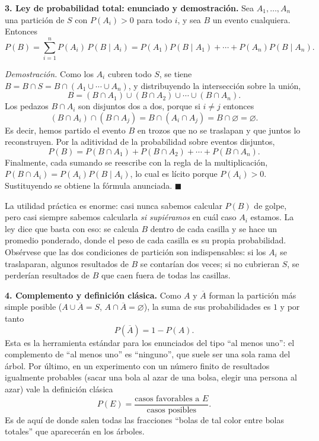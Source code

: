 \documentclass[11pt]{article}
\begin{document}
\begin{teo}
\medskip
\textbf{3. Ley de probabilidad total: enunciado y demostración.}
Sea $A_1,\dots,A_n$ una partición de $S$ con $P(A_i)>0$ para todo $i$, y sea $B$ un evento cualquiera. Entonces
\[
P(B)=\sum_{i=1}^{n}P(A_i)\,P(B\mid A_i)=P(A_1)P(B\mid A_1)+\cdots+P(A_n)P(B\mid A_n).
\]

\emph{Demostración.} Como los $A_i$ cubren todo $S$, se tiene $B=B\cap S=B\cap(A_1\cup\cdots\cup A_n)$, y distribuyendo la intersección sobre la unión,
\[
B=(B\cap A_1)\cup(B\cap A_2)\cup\cdots\cup(B\cap A_n).
\]
Los pedazos $B\cap A_i$ son disjuntos dos a dos, porque si $i\neq j$ entonces
\[
(B\cap A_i)\cap(B\cap A_j)=B\cap(A_i\cap A_j)=B\cap\varnothing=\varnothing .
\]
Es decir, hemos partido el evento $B$ en trozos que no se traslapan y que juntos lo reconstruyen. Por la aditividad de la probabilidad sobre eventos disjuntos,
\[
P(B)=P(B\cap A_1)+P(B\cap A_2)+\cdots+P(B\cap A_n).
\]
Finalmente, cada sumando se reescribe con la regla de la multiplicación, $P(B\cap A_i)=P(A_i)P(B\mid A_i)$, lo cual es lícito porque $P(A_i)>0$. Sustituyendo se obtiene la fórmula anunciada. $\blacksquare$

La utilidad práctica es enorme: casi nunca sabemos calcular $P(B)$ de golpe, pero casi siempre sabemos calcularla \emph{si supiéramos} en cuál caso $A_i$ estamos. La ley dice que basta con eso: se calcula $B$ dentro de cada casilla y se hace un promedio ponderado, donde el peso de cada casilla es su propia probabilidad. Obsérvese que las dos condiciones de partición son indispensables: si los $A_i$ se traslaparan, algunos resultados de $B$ se contarían dos veces; si no cubrieran $S$, se perderían resultados de $B$ que caen fuera de todas las casillas.

\medskip
\textbf{4. Complemento y definición clásica.}
Como $A$ y $\overline{A}$ forman la partición más simple posible ($A\cup\overline{A}=S$, $A\cap\overline{A}=\varnothing$), la suma de sus probabilidades es $1$ y por tanto
\[
P(\overline{A})=1-P(A).
\]
Esta es la herramienta estándar para los enunciados del tipo ``al menos uno'': el complemento de ``al menos uno'' es ``ninguno'', que suele ser una sola rama del árbol. Por último, en un experimento con un número finito de resultados igualmente probables (sacar una bola al azar de una bolsa, elegir una persona al azar) vale la definición clásica
\[
P(E)=\frac{\text{casos favorables a } E}{\text{casos posibles}} .
\]
Es de aquí de donde salen todas las fracciones ``bolas de tal color entre bolas totales'' que aparecerán en los árboles.
\end{teo}
\end{document}
